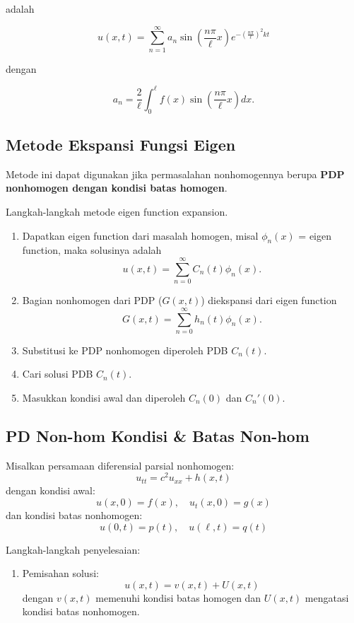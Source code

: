 \documentclass[a4paper,extrafontsizes, 9pt]{memoir}
\begin{document}
\begin{multicols}{3}
adalah

\[
u(x,t) = \sum_{n=1}^{\infty} a_n \sin\left( \frac{n\pi}{\ell} x \right) e^{-\left( \frac{n\pi}{\ell} \right)^2 kt}
\]

dengan

\[
a_n = \frac{2}{\ell} \int_0^{\ell} f(x) \sin\left( \frac{n\pi}{\ell} x \right) dx.
\]
\subsection*{\small Metode Ekspansi Fungsi Eigen}
Metode ini dapat digunakan jika permasalahan nonhomogennya berupa \textbf{PDP nonhomogen dengan kondisi batas homogen}.

Langkah-langkah metode eigen function expansion.

\begin{enumerate}
    \item Dapatkan eigen function dari masalah homogen, misal $\phi_n(x)$ = eigen function, maka solusinya adalah
    \begin{equation}
        u(x,t) = \sum_{n=0}^{\infty} C_n(t)\phi_n(x).
    \end{equation}

    \item Bagian nonhomogen dari PDP ($G(x,t)$) diekspansi dari eigen function
    \begin{equation}
        G(x,t) = \sum_{n=0}^{\infty} h_n(t)\phi_n(x).
    \end{equation}

    \item Substitusi ke PDP nonhomogen diperoleh PDB $C_n(t)$.
    
    \item Cari solusi PDB $C_n(t)$.

    \item Masukkan kondisi awal dan diperoleh $C_n(0)$ dan $C_n'(0)$.
\end{enumerate}
\subsection*{\small PD Non-hom Kondisi \& Batas Non-hom}
Misalkan persamaan diferensial parsial nonhomogen:
\[
u_{tt} = c^2 u_{xx} + h(x,t)
\]
dengan kondisi awal:
\[
u(x,0) = f(x), \quad u_t(x,0) = g(x)
\]
dan kondisi batas nonhomogen:
\[
u(0,t) = p(t), \quad u(\ell,t) = q(t)
\]

Langkah-langkah penyelesaian:

\begin{enumerate}
    \item Pemisahan solusi:
    \[
    u(x,t) = v(x,t) + U(x,t)
    \]
    dengan $v(x,t)$ memenuhi kondisi batas homogen dan $U(x,t)$ mengatasi kondisi batas nonhomogen.
    

\end{enumerate}
\end{multicols}
\end{document}
